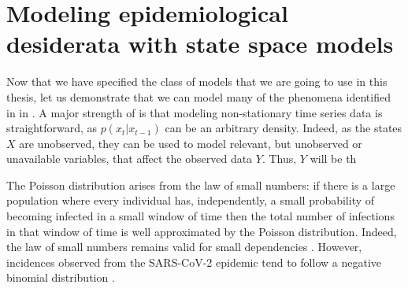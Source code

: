 
\section{Modeling epidemiological desiderata with state space models}
\label{sec:modelling_epidemiological_dessiderata_with_state_space_models}

Now that we have specified the class of models that we are going to use in this thesis, let us demonstrate that we can model many of the phenomena identified in  in . A major strength of  is that modeling non-stationary time series data is straightforward, as $p(x_{t}|x_{t - 1})$ can be an arbitrary density. Indeed, as the states $X$ are unobserved, they can be used to model relevant, but unobserved or unavailable variables, that affect the observed data $Y$. Thus, $Y$ will be th





The Poisson distribution arises from the law of small numbers: if there is a large population where every individual has, independently, a small probability of becoming infected in a small window of time then the total number of infections in that window of time is well approximated by the Poisson distribution.
Indeed, the law of small numbers remains valid for small dependencies \citep{Ross2011Fundamentalsa,Arratia1990Poisson}.
However, incidences observed from the SARS-CoV-2 epidemic tend to follow a negative binomial distribution \citep{Chan2021Count}. 